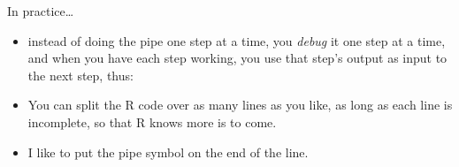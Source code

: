 \documentclass[ignorenonframetext,]{beamer}
\newenvironment{Shaded}{\begin{snugshade}}{\end{snugshade}}
\newcommand{\DataTypeTok}[1]{\textcolor[rgb]{0.13,0.29,0.53}{#1}}
\newcommand{\DecValTok}[1]{\textcolor[rgb]{0.00,0.00,0.81}{#1}}
\newcommand{\KeywordTok}[1]{\textcolor[rgb]{0.13,0.29,0.53}{\textbf{#1}}}
\newcommand{\NormalTok}[1]{#1}
\newcommand{\OperatorTok}[1]{\textcolor[rgb]{0.81,0.36,0.00}{\textbf{#1}}}
\newcommand{\StringTok}[1]{\textcolor[rgb]{0.31,0.60,0.02}{#1}}
\providecommand{\tightlist}{%
  \setlength{\itemsep}{0pt}\setlength{\parskip}{0pt}}
\begin{document}
\begin{frame}[fragile]{In practice\ldots{}}
\protect\hypertarget{in-practice}{}

\begin{itemize}
\tightlist
\item
  instead of doing the pipe one step at a time, you \emph{debug} it one
  step at a time, and when you have each step working, you use that
  step's output as input to the next step, thus:
\end{itemize}

\begin{Shaded}
\end{Shaded}

\begin{itemize}
\tightlist
\item
  You can split the R code over as many lines as you like, as long as
  each line is incomplete, so that R knows more is to come.
\item
  I like to put the pipe symbol on the end of the line.
\end{itemize}

\end{frame}
\end{document}
